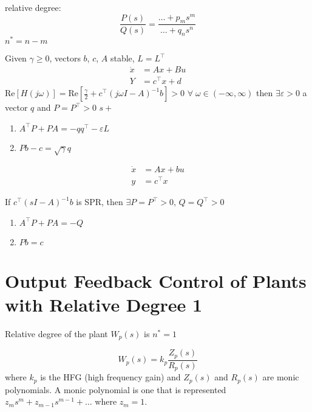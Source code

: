 relative degree:
\begin{equation*}
  \frac{P(s)}{Q(s)}=\frac{\dots+p_{m}s^{m}}{\dots+q_{n}s^{n}}
\end{equation*}
$n^{*}=n-m$

\begin{lem-dan}
  Given $\gamma\geq0$, vectors $b$, $c$, $A$ stable, $L=L^{\top}$
  \begin{align*}
    \dot{x}&=Ax+Bu \\
    Y&=c^{\top}x+d
  \end{align*}
  $\text{Re}[H(j\omega)]=\text{Re}[\frac{\gamma}{2}+c^{\top}(j\omega I-A)^{-1}b]>0$ $\forall\;\omega\in(-\infty,\infty)$ then $\exists\varepsilon>0$ a vector $q$ and $P=P^{\top}>0$ $s+$

  \begin{enumerate}
    \setlength{\itemsep}{0pt}
    \item{$A^{\top}P+PA=-qq^{\top}-\varepsilon L$}
    \item{$Pb-c=\sqrt{\gamma}q$}
  \end{enumerate}
\end{lem-dan}

\begin{lem-dan}[KY]
  \begin{align*}
    \dot{x}&=Ax+bu \\
    y&=c^{\top}x
  \end{align*}

  If $c^{\top}(sI-A)^{-1}b$ is SPR, then $\exists P=P^{\top}>0$, $Q=Q^{\top}>0$
  \begin{enumerate}
    \setlength{\itemsep}{0pt}
    \item{$A^{\top}P+PA=-Q$}
    \item{$Pb=c$}
  \end{enumerate}
\end{lem-dan}

\section{Output Feedback Control of Plants with Relative Degree 1}

Relative degree of the plant $W_{p}(s)$ is $n^{*}=1$

\begin{equation*}
  W_{p}(s)=k_{p}\frac{Z_{p}(s)}{R_{p}(s)}
\end{equation*}
where $k_{p}$ is the HFG (high frequency gain) and $Z_{p}(s)$ and $R_{p}(s)$ are monic polynomials.
A monic polynomial is one that is represented $z_{m}s^{m}+z_{m-1}s^{m-1}+\dots$ where $z_{m}=1$.

